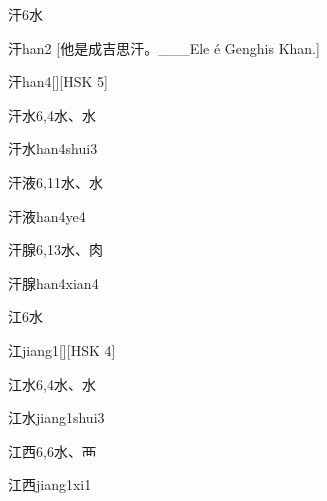 \begin{entry}{汗}{6}{⽔}
  \begin{phonetics}{汗}{han2}
    [他是成吉思汗。___Ele é Genghis Khan.]
  \end{phonetics}
  \begin{phonetics}{汗}{han4}[][HSK 5]
  \end{phonetics}
\end{entry}

\begin{entry}{汗水}{6,4}{⽔、⽔}
  \begin{phonetics}{汗水}{han4shui3}
  \end{phonetics}
\end{entry}

\begin{entry}{汗液}{6,11}{⽔、⽔}
  \begin{phonetics}{汗液}{han4ye4}
  \end{phonetics}
\end{entry}

\begin{entry}{汗腺}{6,13}{⽔、⾁}
  \begin{phonetics}{汗腺}{han4xian4}
  \end{phonetics}
\end{entry}

\begin{entry}{江}{6}{⽔}
  \begin{phonetics}{江}{jiang1}[][HSK 4]
  \end{phonetics}
\end{entry}

\begin{entry}{江水}{6,4}{⽔、⽔}
  \begin{phonetics}{江水}{jiang1shui3}
  \end{phonetics}
\end{entry}

\begin{entry}{江西}{6,6}{⽔、⾑}
  \begin{phonetics}{江西}{jiang1xi1}
  \end{phonetics}
\end{entry}

